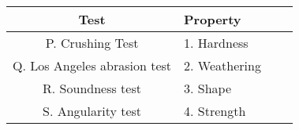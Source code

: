 \begin{center}
	\begin{tabular}{|c|l|c|l|}
		\hline
		\textbf{Test} & \textbf{Property}  \\ \hline
		P. Crushing Test & 1. Hardness \\ \hline
		Q. Los Angeles abrasion test & 2. Weathering \\ \hline
		R. Soundness test & 3. Shape \\ \hline
		S. Angularity test & 4. Strength \\ \hline
	\end{tabular}
\end{center}